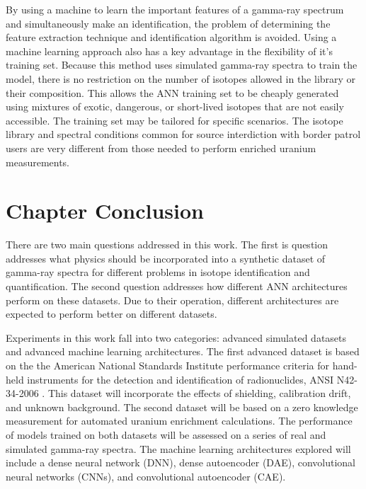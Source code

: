 By using a machine to learn the important features of a gamma-ray spectrum and simultaneously make an identification, the problem of determining the feature extraction technique and identification algorithm is avoided. Using a machine learning approach also has a key advantage in the flexibility of it's training set. Because this method uses simulated gamma-ray spectra to train the model, there is no restriction on the number of isotopes allowed in the library or their composition. This allows the ANN training set to be cheaply generated using mixtures of exotic, dangerous, or short-lived isotopes that are not easily accessible. The training set may be tailored for specific scenarios. The isotope library and spectral conditions common for source interdiction with border patrol users are very different from those needed to perform enriched uranium measurements. %

\section{Chapter Conclusion}

There are two main questions addressed in this work. The first is question addresses what physics should be incorporated into a synthetic dataset of gamma-ray spectra for different problems in isotope identification and quantification. The second question addresses how different ANN architectures perform on these datasets. Due to their operation, different architectures are expected to perform better on different datasets. %

Experiments in this work fall into two categories: advanced simulated datasets and advanced machine learning architectures. The first advanced dataset is based on the the American National Standards Institute performance criteria for hand-held instruments for the detection and identification of radionuclides, ANSI N42-34-2006 \cite{ANSI}. This dataset will incorporate the effects of shielding, calibration drift, and unknown background. The second dataset will be based on a zero knowledge measurement for automated uranium enrichment calculations. The performance of models trained on both datasets will be assessed on a series of real and simulated gamma-ray spectra. The machine learning architectures explored will include a dense neural network (DNN), dense autoencoder (DAE), convolutional neural networks (CNNs), and convolutional autoencoder (CAE).
